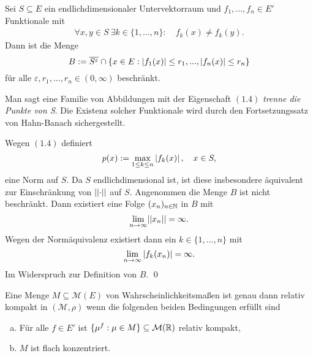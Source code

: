 \begin{lemma}
    Sei $S \subseteq E$ ein endlichdimensionaler Untervektorraum und $f_1,...,f_n \in E'$ Funktionale mit 
    \begin{align}
        \forall x,y \in S \ \exists k \in \{1,...,n\}: \quad f_k(x) \neq f_k(y).
    \end{align}
    Dann ist die Menge 
    $$
        B := \overline{S^{\varepsilon}} \cap \{x \in E: \left| f_1(x) \right| \leq r_1,...,\left| f_n(x) \right|\leq r_n\}
    $$
    für alle $\varepsilon, r_1,...,r_n \in (0, \infty)$ beschränkt. 
\end{lemma}

\begin{remark}%
    Man sagt eine Familie von Abbildungen mit der Eigenschaft $(1.4)$ \textit{trenne die Punkte von S}.
    Die Existenz solcher Funktionale wird durch den Fortsetzungssatz von Hahn-Banach sichergestellt. 
\end{remark}

\begin{proof*}
    Wegen $(1.4)$ definiert 
    $$
        p(x) := \max_{1\leq k \leq n} \left| f_k(x) \right|, \quad x \in S,
    $$
    eine Norm auf $S$. Da $S$ endlichdimensional ist, ist diese insbesondere äquivalent zur Einschränkung von $\lvert\lvert \cdot \rvert\rvert$ auf $S$. 
    Angenommen die Menge $B$ ist nicht beschränkt. Dann existiert eine Folge $(x_n)_{n \in \mathbb{N}}$ in $B$ mit 
    $$
        \lim_{n \to \infty} \lvert\lvert x_n \rvert\rvert = \infty. 
    $$
    Wegen der Normäquivalenz existiert dann ein $k \in \{1,...,n\}$ mit 
    $$
        \lim_{n \to \infty}\left| f_k(x_n) \right| = \infty. 
    $$
    Im Widerspruch zur Definition von $B$. \qed
\end{proof*}

\begin{theorem}
    Eine Menge $M \subseteq \mathcal{M}(E)$ von Wahrscheinlichkeitsmaßen ist genau dann relativ kompakt in $(\mathcal{M}, \rho)$ wenn die folgenden beiden Bedingungen erfüllt sind
    \begin{enumerate}[(a)]
        \item Für alle $f \in E'$ ist $\{\mu^f : \mu \in M\} \subseteq \mathcal{M}(\mathbb{R})$ relativ kompakt,
        \item $M$ ist flach konzentriert. 
    \end{enumerate}
\end{theorem}

